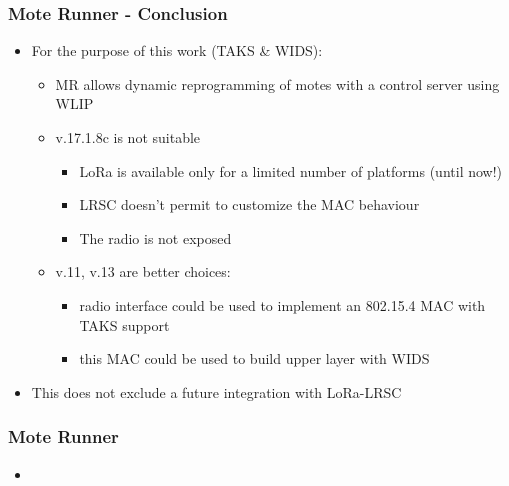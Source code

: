 \begin{frame}[fragile]
  \frametitle{Mote Runner - Conclusion}
  \vspace{-1em}
  \begin{itemize}
    \item For the purpose of this work (TAKS \& WIDS):
    \begin{itemize}
    	\item MR allows dynamic reprogramming of motes with a control server using WLIP
    	\item v.17.1.8c is not suitable
    	\begin{itemize}
	  \item LoRa is available only for a limited number of platforms (until now!)
	  \item LRSC doesn’t permit to customize the MAC behaviour
	  \item The radio is not exposed
    	\end{itemize}
    	\item v.11, v.13 are better choices:
    	\begin{itemize}
	  \item radio interface could be used to implement an 802.15.4 MAC with TAKS support
	  \item this MAC could be used to build upper layer with WIDS
    	\end{itemize}
    \end{itemize}
    \item This does not exclude a future integration with LoRa-LRSC
  \end{itemize}
\end{frame}

\begin{frame}[fragile]
  \frametitle{Mote Runner}
  \begin{itemize}
  	\item 
  \end{itemize}
\end{frame}